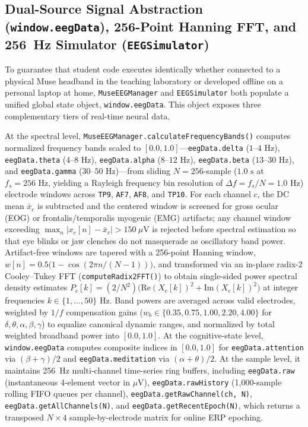 \documentclass[10pt,twocolumn]{article}
\begin{document}
\subsection{Dual-Source Signal Abstraction (\texttt{window.eegData}), 256-Point Hanning FFT, and 256~Hz Simulator (\texttt{EEGSimulator})}
To guarantee that student code executes identically whether connected to a physical Muse headband in the teaching laboratory or developed offline on a personal laptop at home, \texttt{MuseEEGManager} and \texttt{EEGSimulator} both populate a unified global state object, \texttt{window.eegData}. This object exposes three complementary tiers of real-time neural data.

At the spectral level, \texttt{MuseEEGManager.\allowbreak calculateFrequencyBands()} computes normalized frequency bands scaled to $[0.0, 1.0]$---\texttt{eegData.delta} ($1\text{--}4\text{ Hz}$), \texttt{eegData.theta} ($4\text{--}8\text{ Hz}$), \texttt{eegData.alpha} ($8\text{--}12\text{ Hz}$), \texttt{eegData.beta} ($13\text{--}30\text{ Hz}$), and \texttt{eegData.gamma} ($30\text{--}50\text{ Hz}$)---from sliding $N = 256$-sample ($1.0\text{ s}$ at $f_s = 256\text{ Hz}$, yielding a Rayleigh frequency bin resolution of $\Delta f = f_s / N = 1.0\text{ Hz}$) electrode windows across \texttt{TP9}, \texttt{AF7}, \texttt{AF8}, and \texttt{TP10}. For each channel $c$, the DC mean $\bar{x}_c$ is subtracted and the centered window is screened for gross ocular (EOG) or frontalis/temporalis myogenic (EMG) artifacts; any channel window exceeding $\max_{n} |x_c[n] - \bar{x}_c| > 150\ \mu\text{V}$ is rejected before spectral estimation so that eye blinks or jaw clenches do not masquerade as oscillatory band power. Artifact-free windows are tapered with a 256-point Hanning window, $w[n] = 0.5\big(1 - \cos(2\pi n / (N - 1))\big)$, and transformed via an in-place radix-2 Cooley--Tukey FFT (\texttt{computeRadix2FFT()}) to obtain single-sided power spectral density estimates $P_c[k] = (2 / N^2)\big(\text{Re}(X_c[k])^2 + \text{Im}(X_c[k])^2\big)$ at integer frequencies $k \in \{1, \dots, 50\}\text{ Hz}$. Band powers are averaged across valid electrodes, weighted by $1/f$ compensation gains ($w_b \in \{0.35, 0.75, 1.00, 2.20, 4.00\}$ for $\delta, \theta, \alpha, \beta, \gamma$) to equalize canonical dynamic ranges, and normalized by total weighted broadband power into $[0.0, 1.0]$. At the cognitive-state level, \texttt{window.eegData} computes composite indices in $[0.0, 1.0]$ for \texttt{eegData.attention} via $(\beta + \gamma)/2$ and \texttt{eegData.meditation} via $(\alpha + \theta)/2$. At the sample level, it maintains 256~Hz multi-channel time-series ring buffers, including \texttt{eegData.raw} (instantaneous 4-element vector in $\mu\text{V}$), \texttt{eegData.rawHistory} (1,000-sample rolling FIFO queues per channel), \texttt{eegData.getRawChannel(ch, N)}, \texttt{eegData.getAllChannels(N)}, and \texttt{eegData.\allowbreak getRecentEpoch(N)}, which returns a transposed $N \times 4$ sample-by-electrode matrix for online ERP epoching.
\end{document}
